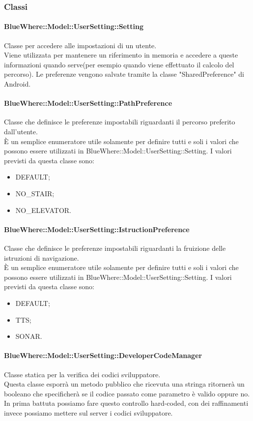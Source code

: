 \documentclass[../SpecificaTecnica.tex]{subfiles}
\begin{document}
		\subsubsection{Classi}
			\paragraph{BlueWhere::Model::UserSetting::Setting}
				Classe per accedere alle impostazioni di un utente. \\
				Viene utilizzata per mantenere un riferimento in memoria e accedere a queste informazioni quando serve(per esempio quando viene effettuato il calcolo del percorso). Le preferenze vengono salvate tramite la classe "SharedPreference" di Android.
			\paragraph{BlueWhere::Model::UserSetting::PathPreference}
				Classe che definisce le preferenze impostabili riguardanti il percorso preferito dall'utente. \\
				È un semplice enumeratore utile solamente per definire tutti e soli i valori che possono essere utilizzati in BlueWhere::Model::UserSetting::Setting.
				I valori previsti da questa classe sono:
				\begin{itemize}
					\item DEFAULT;
					\item NO\_STAIR;
					\item NO\_ELEVATOR.
				\end{itemize}
			\paragraph{BlueWhere::Model::UserSetting::IstructionPreference}
				Classe che definisce le preferenze impostabili riguardanti la fruizione delle istruzioni di navigazione. \\
				È un semplice enumeratore utile solamente per definire tutti e soli i valori che possono essere utilizzati in BlueWhere::Model::UserSetting::Setting.
				I valori previsti da questa classe sono:
				\begin{itemize}
					\item DEFAULT;
					\item TTS;
					\item SONAR.
				\end{itemize}
			\paragraph{BlueWhere::Model::UserSetting::DeveloperCodeManager}
				Classe statica per la verifica dei codici sviluppatore. \\
				Questa classe esporrà un metodo pubblico che ricevuta una stringa ritornerà un booleano che specificherà se il codice passato come parametro è valido oppure no. In prima battuta possiamo fare questo controllo hard-coded, con dei raffinamenti invece possiamo mettere sul server i codici sviluppatore.
	\newpage
\end{document}
